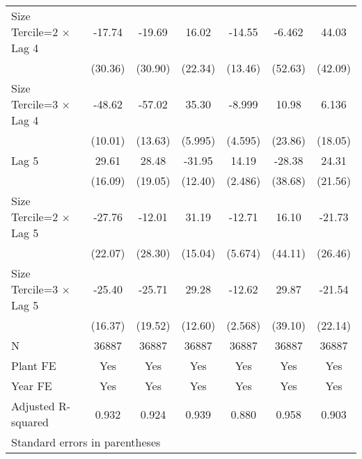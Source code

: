 \begin{table}[htbp]
\begin{tabular}{l*{6}{c}}
\addlinespace
Size Tercile=2 $\times$ Lag 4&   -17.74         &   -19.69         &    16.02         &   -14.55         &   -6.462         &    44.03         \\
                &  (30.36)         &  (30.90)         &  (22.34)         &  (13.46)         &  (52.63)         &  (42.09)         \\
\addlinespace
Size Tercile=3 $\times$ Lag 4&   -48.62\sym{***}&   -57.02\sym{***}&    35.30\sym{***}&   -8.999         &    10.98         &    6.136         \\
                &  (10.01)         &  (13.63)         &  (5.995)         &  (4.595)         &  (23.86)         &  (18.05)         \\
\addlinespace
Lag 5           &    29.61         &    28.48         &   -31.95\sym{**} &    14.19\sym{***}&   -28.38         &    24.31         \\
                &  (16.09)         &  (19.05)         &  (12.40)         &  (2.486)         &  (38.68)         &  (21.56)         \\
\addlinespace
Size Tercile=2 $\times$ Lag 5&   -27.76         &   -12.01         &    31.19\sym{*}  &   -12.71\sym{*}  &    16.10         &   -21.73         \\
                &  (22.07)         &  (28.30)         &  (15.04)         &  (5.674)         &  (44.11)         &  (26.46)         \\
\addlinespace
Size Tercile=3 $\times$ Lag 5&   -25.40         &   -25.71         &    29.28\sym{*}  &   -12.62\sym{***}&    29.87         &   -21.54         \\
                &  (16.37)         &  (19.52)         &  (12.60)         &  (2.568)         &  (39.10)         &  (22.14)         \\
\midrule
N               &    36887         &    36887         &    36887         &    36887         &    36887         &    36887         \\
Plant FE        &      Yes         &      Yes         &      Yes         &      Yes         &      Yes         &      Yes         \\
Year FE         &      Yes         &      Yes         &      Yes         &      Yes         &      Yes         &      Yes         \\
Adjusted R-squared&    0.932         &    0.924         &    0.939         &    0.880         &    0.958         &    0.903         \\
\bottomrule
\multicolumn{7}{l}{\footnotesize Standard errors in parentheses}\\

\end{tabular}
\end{table}
